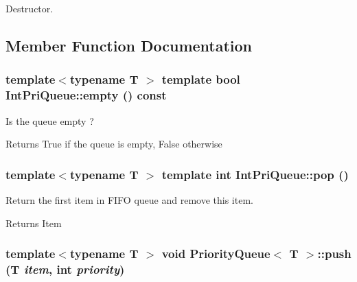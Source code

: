 Destructor. 



\subsection{Member Function Documentation}
\hypertarget{class_priority_queue_a495abe086dd248059e4325cdf08e1bb1}{
\subsubsection[{empty}]{\setlength{\rightskip}{0pt plus 5cm}template$<$typename T $>$ template bool IntPriQueue::empty () const}}
\label{class_priority_queue_a495abe086dd248059e4325cdf08e1bb1}


Is the queue empty ? 

\begin{DoxyReturn}{Returns}
True if the queue is empty, False otherwise 
\end{DoxyReturn}
\hypertarget{class_priority_queue_a38deb7818722ba5bdf328541c0f669e8}{
\subsubsection[{pop}]{\setlength{\rightskip}{0pt plus 5cm}template$<$typename T $>$ template int IntPriQueue::pop ()}}
\label{class_priority_queue_a38deb7818722ba5bdf328541c0f669e8}


Return the first item in FIFO queue and remove this item. 

\begin{DoxyReturn}{Returns}
Item 
\end{DoxyReturn}
\hypertarget{class_priority_queue_a88c0b212c85e6e500d6213a6ee0b6463}{
\subsubsection[{push}]{\setlength{\rightskip}{0pt plus 5cm}template$<$typename T $>$ void {\bf PriorityQueue}$<$ T $>$::push (T {\em item}, \/  int {\em priority})}}
\label{class_priority_queue_a88c0b212c85e6e500d6213a6ee0b6463}


